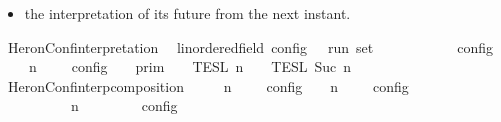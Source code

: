 \begin{isabellebody}
\begin{isamarkuptext}
\begin{itemize}
\item the interpretation of its future from the next instant.%
\end{itemize}%
\end{isamarkuptext}\isamarkuptrue%
\isamarkupfalse%
\ HeronConf{\isacharunderscore}interpretation\isanewline
\ \ {\isacharcolon}{\isacharcolon}{\isacartoucheopen}{\isacharprime}{\isasymtau}{\isacharcolon}{\isacharcolon}linordered{\isacharunderscore}field\ config\ {\isasymRightarrow}\ {\isacharprime}{\isasymtau}\ run\ set{\isacartoucheclose}\ \ \ \ \ \ \ \ \ \ {\isacharparenleft}{\isacartoucheopen}{\isasymlbrakk}\ {\isacharunderscore}\ {\isasymrbrakk}\isactrlsub c\isactrlsub o\isactrlsub n\isactrlsub f\isactrlsub i\isactrlsub g{\isacartoucheclose}\ {}{}{\isacharparenright}\isanewline
{}\isanewline
\ \ {\isacartoucheopen}{\isasymlbrakk}\ {\isasymGamma}{\isacharcomma}\ n\ {\isasymturnstile}\ {\isasymPsi}\ {\isasymtriangleright}\ {\isasymPhi}\ {\isasymrbrakk}\isactrlsub c\isactrlsub o\isactrlsub n\isactrlsub f\isactrlsub i\isactrlsub g\ {\isacharequal}\ {\isasymlbrakk}{\isasymlbrakk}\ {\isasymGamma}\ {\isasymrbrakk}{\isasymrbrakk}\isactrlsub p\isactrlsub r\isactrlsub i\isactrlsub m\ {\isasyminter}\ {\isasymlbrakk}{\isasymlbrakk}\ {\isasymPsi}\ {\isasymrbrakk}{\isasymrbrakk}\isactrlsub T\isactrlsub E\isactrlsub S\isactrlsub L\isactrlbsup {\isasymge}\ n\isactrlesup \ {\isasyminter}\ {\isasymlbrakk}{\isasymlbrakk}\ {\isasymPhi}\ {\isasymrbrakk}{\isasymrbrakk}\isactrlsub T\isactrlsub E\isactrlsub S\isactrlsub L\isactrlbsup {\isasymge}\ Suc\ n\isactrlesup {\isacartoucheclose}\isanewline
\isanewline
{}\isamarkupfalse%
\ HeronConf{\isacharunderscore}interp{\isacharunderscore}composition{\isacharcolon}\isanewline
\ \ \ {\isacartoucheopen}{\isasymlbrakk}\ {\isasymGamma}\ n\ {\isasymturnstile}\ {\isasymPsi}\ {\isasymtriangleright}\ {\isasymPhi}\ {\isasymrbrakk}\isactrlsub c\isactrlsub o\isactrlsub n\isactrlsub f\isactrlsub i\isactrlsub g\ {\isasyminter}\ {\isasymlbrakk}\ {\isasymGamma}\ n\ {\isasymturnstile}\ {\isasymPsi}\ {\isasymtriangleright}\ {\isasymPhi}\ {\isasymrbrakk}\isactrlsub c\isactrlsub o\isactrlsub n\isactrlsub f\isactrlsub i\isactrlsub g\isanewline
\ \ \ \ \ {\isacharequal}\ {\isasymlbrakk}\ {\isacharparenleft}{\isasymGamma}\ {\isacharat}\ {\isasymGamma}\ n\ {\isasymturnstile}\ {\isacharparenleft}{\isasymPsi}\ {\isacharat}\ {\isasymPsi}\ {\isasymtriangleright}\ {\isacharparenleft}{\isasymPhi}\ {\isacharat}\ {\isasymPhi}\ {\isasymrbrakk}\isactrlsub c\isactrlsub o\isactrlsub n\isactrlsub f\isactrlsub i\isactrlsub g{\isacartoucheclose}\isanewline

\end{isabellebody}
